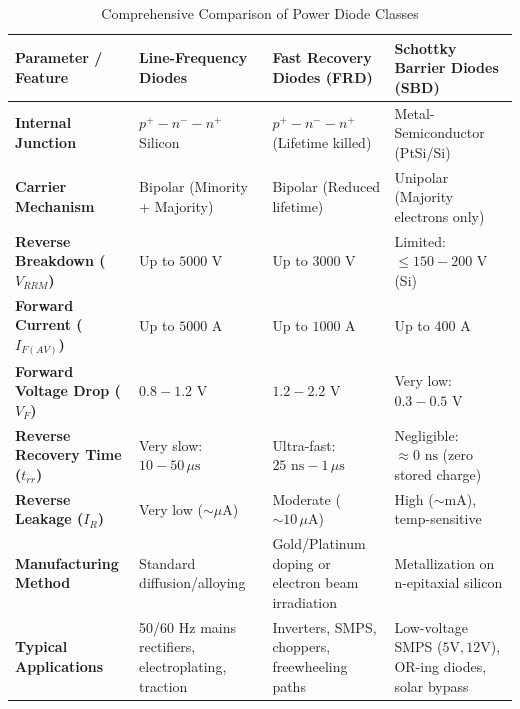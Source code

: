 \documentclass[11pt,a4paper]{article}
\begin{document}
\begin{table}[htbp]
\centering
\small
\caption{Comprehensive Comparison of Power Diode Classes}
\label{tab:diode_classes}
\begin{tabularx}{\textwidth}{l Y Y Y}
\toprule
\textbf{Parameter / Feature} & \textbf{Line-Frequency Diodes} & \textbf{Fast Recovery Diodes (FRD)} & \textbf{Schottky Barrier Diodes (SBD)} \\
\midrule
\textbf{Internal Junction} & $p^+-n^--n^+$ Silicon & $p^+-n^--n^+$ (Lifetime killed) & Metal-Semiconductor (PtSi/Si) \\
\textbf{Carrier Mechanism} & Bipolar (Minority + Majority) & Bipolar (Reduced lifetime) & Unipolar (Majority electrons only) \\
\textbf{Reverse Breakdown ($V_{RRM}$)} & Up to $5000\text{ V}$ & Up to $3000\text{ V}$ & Limited: $\le 150 - 200\text{ V}$ (Si) \\
\textbf{Forward Current ($I_{F(AV)}$)} & Up to $5000\text{ A}$ & Up to $1000\text{ A}$ & Up to $400\text{ A}$ \\
\textbf{Forward Voltage Drop ($V_F$)} & $0.8 - 1.2\text{ V}$ & $1.2 - 2.2\text{ V}$ & Very low: $0.3 - 0.5\text{ V}$ \\
\textbf{Reverse Recovery Time ($t_{rr}$)} & Very slow: $10 - 50\,\mu\text{s}$ & Ultra-fast: $25\text{ ns} - 1\,\mu\text{s}$ & Negligible: $\approx 0\text{ ns}$ (zero stored charge) \\
\textbf{Reverse Leakage ($I_{R}$)} & Very low ($\sim \mu\text{A}$) & Moderate ($\sim 10\,\mu\text{A}$) & High ($\sim \text{mA}$), temp-sensitive \\
\textbf{Manufacturing Method} & Standard diffusion/alloying & Gold/Platinum doping or electron beam irradiation & Metallization on n-epitaxial silicon \\
\textbf{Typical Applications} & 50/60 Hz mains rectifiers, electroplating, traction & Inverters, SMPS, choppers, freewheeling paths & Low-voltage SMPS ($5\text{V}, 12\text{V}$), OR-ing diodes, solar bypass \\
\bottomrule
\end{tabularx}
\end{table}
\end{document}
